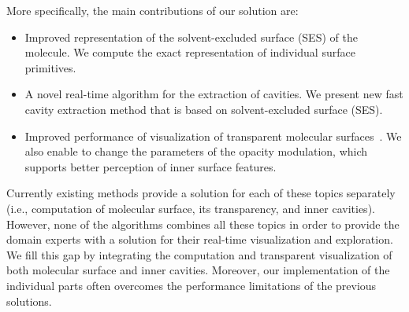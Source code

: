 More specifically, the main contributions of our solution are:
\begin{itemize}
  \item  Improved representation of the solvent-excluded surface (SES) of the molecule. We compute the exact representation of individual surface primitives.
  \item A novel real-time algorithm for the extraction of cavities. We present new fast cavity extraction method that is based on solvent-excluded surface (SES).
  \item Improved performance of visualization of transparent molecular surfaces~\cite{kauker2013rendering}. We also enable to change the parameters of the opacity modulation, which supports better perception of inner surface features.
  
\end{itemize}

Currently existing methods provide a solution for each of these topics separately (i.e., computation of molecular surface, its transparency, and inner cavities).
However, none of the algorithms combines all these topics in order to provide the domain experts with a solution for their real-time visualization and exploration.
We fill this gap by integrating the computation and transparent visualization of both molecular surface and inner cavities.
Moreover, our implementation of the individual parts often overcomes the performance limitations of the previous solutions.



